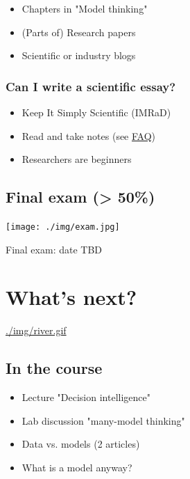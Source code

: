 \documentclass[11pt]{article}
\begin{document}
\begin{itemize}
\item Chapters in "Model thinking"
\item (Parts of) Research papers
\item Scientific or industry blogs
\end{itemize}

\subsubsection*{Can I write a scientific essay?}
\label{sec:org3c882c4}

\begin{itemize}
\item Keep It Simply Scientific (IMRaD)
\item Read and take notes (see \href{https://github.com/birkenkrahe/org/blob/master/FAQ.md}{FAQ})
\item Researchers are beginners
\end{itemize}

\subsection*{Final exam (> 50\%)}
\label{sec:orgdceca49}

\begin{center}
\texttt{[image: ./img/exam.jpg]}
\end{center}

Final exam: date TBD

\section*{What's next?}
\label{sec:org3f48e30}

\url{./img/river.gif}

\subsection*{In the course}
\label{sec:orgb6e40d1}

\begin{itemize}
\item Lecture "Decision intelligence"
\item Lab discussion "many-model thinking"
\item Data vs. models (2 articles)
\item What is a model anyway?
\end{itemize}
\end{document}
